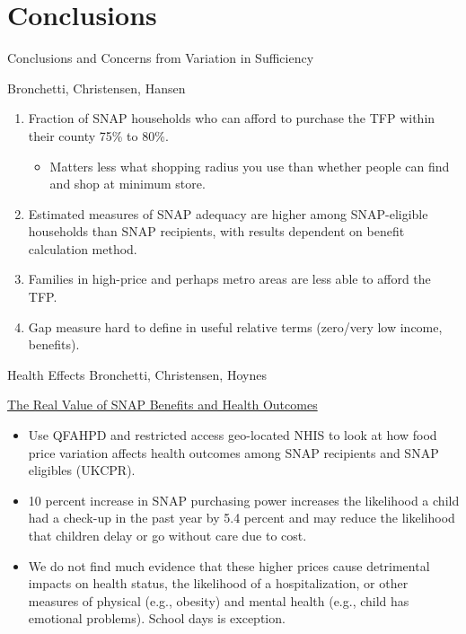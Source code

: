 \documentclass{beamer}
\begin{document}
\section{Conclusions}

\begin{frame}{Conclusions and Concerns from Variation in Sufficiency}
 
Bronchetti, Christensen, Hansen
 
\begin{enumerate}
\item 
Fraction of SNAP households who can afford to purchase the TFP within their county 75\% to 80\%.

\begin{itemize}
\item Matters less what shopping radius you use than whether people can find and shop at minimum store.

\end{itemize}
\item 
Estimated measures of SNAP adequacy are higher among SNAP-eligible households than SNAP recipients, with results dependent on benefit calculation method.
\item 
Families in high-price and perhaps metro areas are less able to afford the TFP.

\item Gap measure hard to define in useful relative terms (zero/very low income, benefits).
\end{enumerate}
\end{frame}

\begin{frame}{Health Effects}
 Bronchetti, Christensen, Hoynes
 
\href{http://www.ukcpr.org/sites/www.ukcpr.org/files/UKCPR\%20Grant\%20Winners\%20Announcement.pdf}{The Real Value of SNAP Benefits and Health Outcomes}
\begin{itemize}
\item Use QFAHPD and restricted access geo-located NHIS to look at how food price variation affects health outcomes among SNAP recipients and SNAP eligibles (UKCPR).
\item 
10 percent increase in SNAP purchasing power increases the likelihood a child had a check-up in the past year by 5.4 percent and may reduce the likelihood that children delay or go without care due to cost.
\item
We do not find much evidence that these higher prices cause detrimental impacts on health status, the likelihood of a hospitalization, or other measures of physical (e.g., obesity) and mental health (e.g., child has emotional problems). School days is exception.
\end{itemize}
\end{frame}
\end{document}
